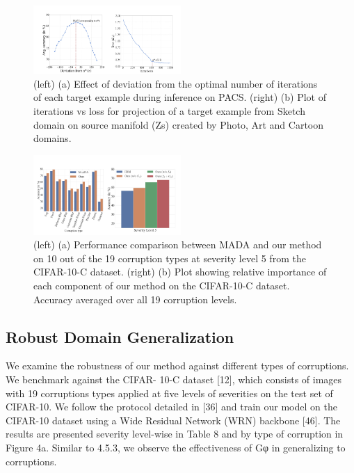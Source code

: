 \documentclass[review]{cvpr}
\begin{document}
\begin{figure}[t]
    \centering
    \includegraphics[width=0.5\textwidth]{fig3.png}
    \caption{ (left) (a) Effect of deviation from the optimal
number of iterations of each target example during inference on PACS. (right) (b) Plot of iterations vs loss for projection of a target example from Sketch domain on source
manifold (Zs) created by Photo, Art and Cartoon domains.}
    \label{fig:fig3}
\end{figure}

\begin{figure}[t]
    \centering
    \includegraphics[width=0.5\textwidth]{fig4.png}
    \caption{ (left) (a) Performance comparison between MADA and our method on 10 out of the 19 corruption types
at severity level 5 from the CIFAR-10-C dataset. (right)
(b) Plot showing relative importance of each component of
our method on the CIFAR-10-C dataset. Accuracy averaged
over all 19 corruption levels.}
    \label{fig:fig4}
\end{figure}





\subsection{Robust Domain Generalization}
We examine the robustness of our method against different types of corruptions. We benchmark against the CIFAR-
10-C dataset [12], which consists of images with 19 corruptions types applied at five levels of severities on the test
set of CIFAR-10. We follow the protocol detailed in [36]
and train our model on the CIFAR-10 dataset using a Wide
Residual Network (WRN) backbone [46]. The results are
presented severity level-wise in Table 8 and by type of corruption in Figure 4a. Similar to 4.5.3, we observe the effectiveness of Gφ in generalizing to corruptions.
\end{document}
